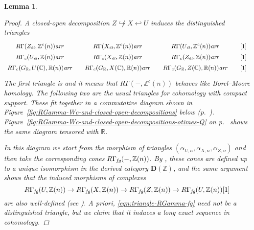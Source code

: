 \documentclass[10pt,a4paper,oneside,draft]{article}
\newcommand{\CC}{\mathbb{C}}
\newcommand{\RR}{\mathbb{R}}
\newcommand{\ZZ}{\mathbb{Z}}
\newcommand{\ar}{\text{\it ar}}
\newcommand{\et}{\text{\it \'{e}t}}
\newcommand{\fg}{\text{\it fg}}
\theoremstyle{myplain}
\newtheorem{lemma}[theorem]{Lemma}
\theoremstyle{mydefinition}
\numberwithin{equation}{section}
\begin{document}
\begin{lemma}
  \begin{proof}
    A closed-open decomposition $Z \not\hookrightarrow X \hookleftarrow U$
    induces the distinguished triangles
    \[ \begin{tikzcd}[row sep=0pt,column sep=1em,font=\small]
        R\Gamma (Z_\et, \ZZ^c (n)) \ar{r} & R\Gamma (X_\et, \ZZ^c (n)) \ar{r} & R\Gamma (U_\et, \ZZ^c (n)) \ar{r} & {[1]} \\
        R\Gamma_c (U_\et, \ZZ (n)) \ar{r} & R\Gamma_c (X_\et, \ZZ (n)) \ar{r} & R\Gamma_c (Z_\et, \ZZ (n)) \ar{r} & {[1]} \\
        R\Gamma_c (G_\RR, U (\CC), \RR (n)) \ar{r} & R\Gamma_c (G_\RR, X (\CC), \RR (n)) \ar{r} & R\Gamma_c (G_\RR, Z (\CC), \RR (n)) \ar{r} & {[1]}
      \end{tikzcd} \]
    The first triangle is \cite[Corollary~7.2]{Geisser-2010} and it means that
    $R\Gamma (-, \ZZ^c (n))$ behaves like Borel--Moore homology. The following
    two are the usual triangles for cohomology with compact support. These fit
    together in a commutative diagram shown in
    Figure~\ref{fig:RGamma-Wc-and-closed-open-decompositions} below
    (p.~\pageref{fig:RGamma-Wc-and-closed-open-decompositions}). Figure~\ref{fig:RGamma-Wc-and-closed-open-decompositions-otimes-Q}
    on p.~\pageref{fig:RGamma-Wc-and-closed-open-decompositions-otimes-Q} shows
    the same diagram tensored with $\RR$.

    In this diagram we start from the morphism of triangles
    $(\alpha_{U,n}, \alpha_{X,n}, \alpha_{Z,n})$ and then take the corresponding
    cones $R\Gamma_\fg (-, \ZZ(n))$. By
    \cite[Proposition~5.6]{Beshenov-Weil-etale-1}, these cones are defined up to
    a \emph{unique} isomorphism in the derived category $\mathbf{D} (\ZZ)$, and
    the same argument shows that the induced morphisms of complexes
    \begin{equation}
      \label{eqn:triangle-RGamma-fg}
      R\Gamma_\fg (U, \ZZ(n)) \to
      R\Gamma_\fg (X, \ZZ(n)) \to
      R\Gamma_\fg (Z, \ZZ(n)) \to
      R\Gamma_\fg (U, \ZZ(n)) [1]
    \end{equation}
    are also well-defined
    (see \cite[Corollary~A.3]{Beshenov-Weil-etale-1}). A priori,
    \eqref{eqn:triangle-RGamma-fg} need not be a distinguished triangle, but we
    claim that it induces a long exact sequence in cohomology.


\end{proof}
\end{lemma}
\end{document}
